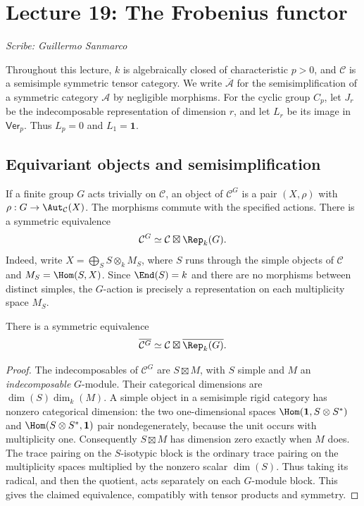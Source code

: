 \section{Lecture 19: The Frobenius functor}
\label{lec19}
\noindent\textit{Scribe: Guillermo Sanmarco}

Throughout this lecture, $k$ is algebraically closed of characteristic $p>0$,
and $\mathcal C$ is a semisimple symmetric tensor category. We write
$\overline{\mathcal A}$ for the semisimplification of a symmetric category
$\mathcal A$ by negligible morphisms. For the cyclic group $C_p$, let $J_r$
be the indecomposable representation of dimension $r$, and let $L_r$ be its
image in $\mathsf{Ver}_p$. Thus $L_p=0$ and $L_1=\mathbf1$.

\subsection{Equivariant objects and semisimplification}
If a finite group $G$ acts trivially on $\mathcal C$, an object of
$\mathcal C^G$ is a pair $(X,\rho)$ with $\rho:G\to\Aut_{\mathcal C}(X)$.
The morphisms commute with the specified actions. There is a symmetric
equivalence
\[
 \mathcal C^G\simeq\mathcal C\boxtimes\Rep_k(G).
\]
Indeed, write $X=\bigoplus_S S\otimes_k M_S$, where $S$ runs through the
simple objects of $\mathcal C$ and $M_S=\Hom(S,X)$. Since
$\End(S)=k$ and there are no morphisms between distinct simples, the
$G$-action is precisely a representation on each multiplicity space $M_S$.

\begin{proposition}\label{lec19-equivariant-semisimplification}
There is a symmetric equivalence
\[
 \overline{\mathcal C^G}
 \simeq\mathcal C\boxtimes\overline{\Rep_k(G)}.
\]
\end{proposition}
\begin{proof}
The indecomposables of $\mathcal C^G$ are $S\boxtimes M$, with $S$ simple
and $M$ an \emph{indecomposable} $G$-module. Their categorical dimensions are
$\dim(S)\dim_k(M)$. A simple object in a semisimple rigid category has
nonzero categorical dimension: the two one-dimensional spaces
$\Hom(\mathbf1,S\otimes S^*)$ and $\Hom(S\otimes S^*,\mathbf1)$ pair
nondegenerately, because the unit occurs with multiplicity one.
Consequently $S\boxtimes M$ has dimension zero exactly when $M$ does.
The trace pairing on the $S$-isotypic block is the ordinary trace pairing
on the multiplicity spaces multiplied by the nonzero scalar $\dim(S)$.
Thus taking its radical, and then the quotient, acts separately on each
$G$-module block. This gives the claimed equivalence, compatibly with tensor
products and symmetry.
\end{proof}

